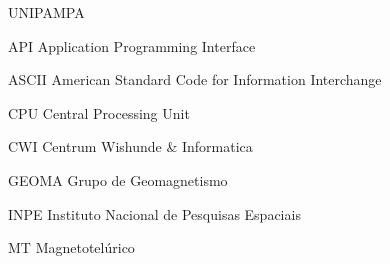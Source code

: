 \documentclass[csgeo,tcc]{unipampa}
\begin{document}









\listoffigures
\listoftables














\begin{listofabbrv}{UNIPAMPA}
        
        \item[API]          {Application Programming Interface}
        \item[ASCII]        {American Standard Code for Information Interchange}
        \item[CPU]          {Central Processing Unit}
        \item[CWI]          {Centrum Wishunde \& Informatica}
        \item[GEOMA]        {Grupo de Geomagnetismo}
        \item[INPE]         {Instituto Nacional de Pesquisas Espaciais}
        \item[MT]           {Magnetotelúrico}        
        
\end{listofabbrv}
\end{document}
